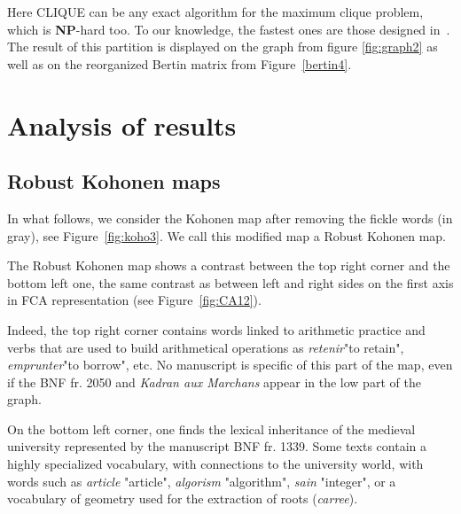 \documentclass[preprint]{elsarticle}
\begin{document}
Here CLIQUE can be any exact algorithm for the maximum clique problem, which is \textbf{NP}-hard too. To our knowledge, the fastest ones are those designed in~\cite{exactis}.\\

The result of this partition is displayed on the graph from figure \ref{fig:graph2} as well as on the reorganized Bertin matrix from Figure~\ref{bertin4}.

\section{Analysis of results}\label{analysis}


\subsection{Robust Kohonen maps}

In what follows, we consider the Kohonen map after removing the fickle words (in gray), see Figure~\ref{fig:koho3}. We call this modified map a Robust Kohonen map. 




The Robust Kohonen map shows a contrast between the top right corner and the bottom left one, the same contrast as between left and right sides on the first axis in FCA representation (see Figure~\ref{fig:CA12}).

Indeed, the top right corner contains words linked to arithmetic practice and verbs that are used to build arithmetical operations as \textit{retenir}"to retain", \textit{emprunter}"to borrow", etc. No manuscript is specific of this part of the map, even if the BNF fr. 2050 and \textit{Kadran aux Marchans} appear in the low part of the graph. 

On the bottom left corner, one finds the lexical inheritance of the medieval university  represented by the manuscript BNF fr. 1339. Some texts contain a highly specialized vocabulary, with connections to the university world, with words such as \textit{article} "article", \textit{algorism} "algorithm", \textit{sain} "integer", or a vocabulary of geometry used for the extraction of roots (\textit{carree}).\\
\end{document}
